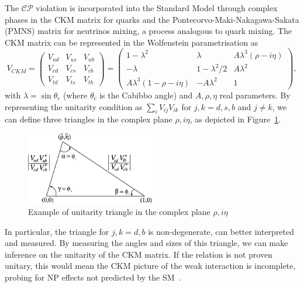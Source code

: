  The $\mathcal{CP}$ violation is incorporated into the Standard Model through complex phases in the CKM matrix for quarks and the Pontecorvo-Maki-Nakagawa-Sakata (PMNS) matrix for neutrinos mixing, a process analogous to quark mixing. The CKM matrix can be represented in the Wolfenstein parametrisation as 
 \begin{equation}
 V_{CKM} = 
     \begin{pmatrix}
         V_{ud} & V_{us} & V_{ub}\\
         V_{cd} & V_{cs} & V_{cb}\\
         V_{td} & V_{ts} & V_{tb}
     \end{pmatrix}
     =
     \begin{pmatrix}
         1-\lambda^2 & \lambda & A\lambda^3(\rho-i\eta)\\
         -\lambda & 1-\lambda^2/2 & A\lambda^2\\
         A\lambda^3(1-\rho-i\eta) & -A\lambda^2 &1
     \end{pmatrix},
 \end{equation}
 with $\lambda = \sin\theta_c$ (where $\theta_c$ is the Cabibbo angle) and $A,\rho,\eta$ real parameters.
 By representing the unitarity condition as $\sum_i V_{ij} V_{ik}$ for $j,k=d,s,b$ and $j\neq k$, we can define three triangles in the complex plane $\rho,i\eta$, as depicted in Figure~\ref{fig:unitary-triangle}.
 \begin{figure}
     \centering
     \includegraphics[width=0.5\textwidth]{figures/The-CKM-unitarity-triangle-Figure-from-Ref-4.png}
     \caption{Example of unitarity triangle in the complex plane  $\rho,i\eta$}
     \label{fig:unitary-triangle}
 \end{figure}
 In particular, the triangle for $j,k=d,b$ is non-degenerate, can better interpreted and measured. By measuring the angles and sizes of this triangle, we can make inference on the unitarity of the CKM matrix. If the relation is not proven unitary, this would mean the CKM picture of the weak interaction is incomplete, probing for NP effects not predicted by the SM~\cite{PhysRevLett.10.531, 10.1143/PTP.49.652}. 

